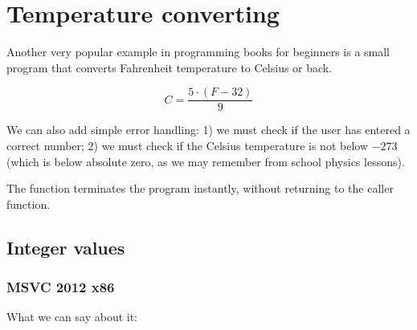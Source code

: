 \section{Temperature converting}

Another very popular example in 
programming books for beginners is a small program that converts Fahrenheit temperature to Celsius or back.

\[
	C=\frac{5 \cdot (F-32)}{9}
\]

We can also add simple error handling:
1) we must check if the user has entered a correct number;
2) we must check if the Celsius temperature is not below $-273$ 
(which is below absolute zero, as we may remember from school physics lessons).

The  function terminates 
the program instantly, without returning to the \gls{caller} function.

\subsection{Integer values}



\subsubsection{\Optimizing MSVC 2012 x86}



What we can say about it:

